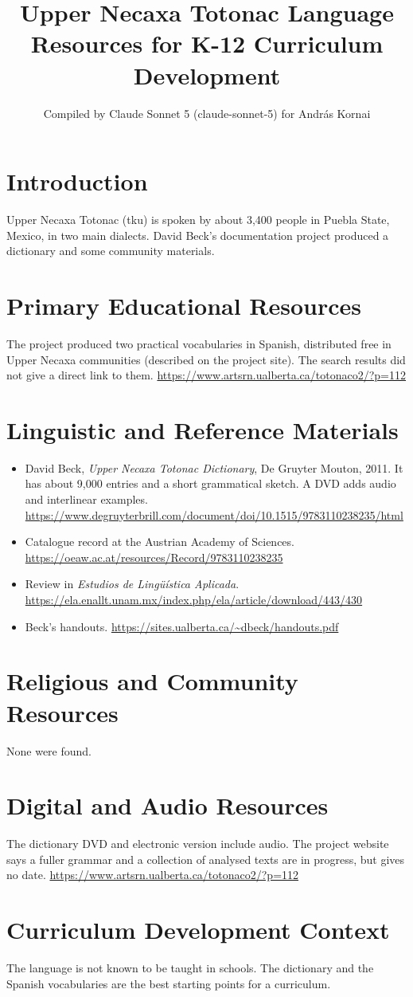 \documentclass[12pt]{article}
\title{Upper Necaxa Totonac Language Resources for K-12 Curriculum Development}
\author{Compiled by Claude Sonnet 5 (claude-sonnet-5) for Andr\'as Kornai}
\date{}
\begin{document}
\maketitle

\section{Introduction}
Upper Necaxa Totonac (tku) is spoken by about 3,400 people in Puebla State, Mexico, in two main dialects. David Beck's documentation project produced a dictionary and some community materials.

\section{Primary Educational Resources}
The project produced two practical vocabularies in Spanish, distributed free in Upper Necaxa communities (described on the project site). The search results did not give a direct link to them. \url{https://www.artsrn.ualberta.ca/totonaco2/?p=112}

\section{Linguistic and Reference Materials}
\begin{itemize}
\item David Beck, \emph{Upper Necaxa Totonac Dictionary}, De Gruyter Mouton, 2011. It has about 9,000 entries and a short grammatical sketch. A DVD adds audio and interlinear examples. \url{https://www.degruyterbrill.com/document/doi/10.1515/9783110238235/html}
\item Catalogue record at the Austrian Academy of Sciences. \url{https://oeaw.ac.at/resources/Record/9783110238235}
\item Review in \emph{Estudios de Ling\"u\'istica Aplicada}. \url{https://ela.enallt.unam.mx/index.php/ela/article/download/443/430}
\item Beck's handouts. \url{https://sites.ualberta.ca/~dbeck/handouts.pdf}
\end{itemize}

\section{Religious and Community Resources}
None were found.

\section{Digital and Audio Resources}
The dictionary DVD and electronic version include audio. The project website says a fuller grammar and a collection of analysed texts are in progress, but gives no date. \url{https://www.artsrn.ualberta.ca/totonaco2/?p=112}

\section{Curriculum Development Context}
The language is not known to be taught in schools. The dictionary and the Spanish vocabularies are the best starting points for a curriculum.
\end{document}
